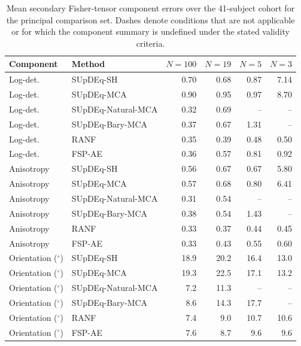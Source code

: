 \begin{table}[ht!]
\centering
\caption{Mean secondary Fisher-tensor component errors over the 41-subject cohort for the principal comparison set. Dashes denote conditions that are not applicable or for which the component summary is undefined under the stated validity criteria.}
\label{tab:tensor_component_means}
\scriptsize
\begin{tabular}{llrrrr}
\toprule
Component & Method & $N=100$ & $N=19$ & $N=5$ & $N=3$ \\
\midrule
Log-det. & SUpDEq-SH & 0.70 & 0.68 & 0.87 & 7.14 \\
Log-det. & SUpDEq-MCA & 0.90 & 0.95 & 0.97 & 8.70 \\
Log-det. & SUpDEq-Natural-MCA & 0.32 & 0.69 & -- & -- \\
Log-det. & SUpDEq-Bary-MCA & 0.37 & 0.67 & 1.31 & -- \\
Log-det. & RANF & 0.35 & 0.39 & 0.48 & 0.50 \\
Log-det. & FSP-AE & 0.36 & 0.57 & 0.81 & 0.92 \\
\addlinespace
Anisotropy & SUpDEq-SH & 0.56 & 0.67 & 0.67 & 5.80 \\
Anisotropy & SUpDEq-MCA & 0.57 & 0.68 & 0.80 & 6.41 \\
Anisotropy & SUpDEq-Natural-MCA & 0.31 & 0.54 & -- & -- \\
Anisotropy & SUpDEq-Bary-MCA & 0.38 & 0.54 & 1.43 & -- \\
Anisotropy & RANF & 0.33 & 0.37 & 0.44 & 0.45 \\
Anisotropy & FSP-AE & 0.33 & 0.43 & 0.55 & 0.60 \\
\addlinespace
Orientation ($^\circ$) & SUpDEq-SH & 18.9 & 20.2 & 16.4 & 13.0 \\
Orientation ($^\circ$) & SUpDEq-MCA & 19.3 & 22.5 & 17.1 & 13.2 \\
Orientation ($^\circ$) & SUpDEq-Natural-MCA & 7.2 & 11.3 & -- & -- \\
Orientation ($^\circ$) & SUpDEq-Bary-MCA & 8.6 & 14.3 & 17.7 & -- \\
Orientation ($^\circ$) & RANF & 7.4 & 9.0 & 10.7 & 10.6 \\
Orientation ($^\circ$) & FSP-AE & 7.6 & 8.7 & 9.6 & 9.6 \\
\bottomrule
\end{tabular}
\end{table}
